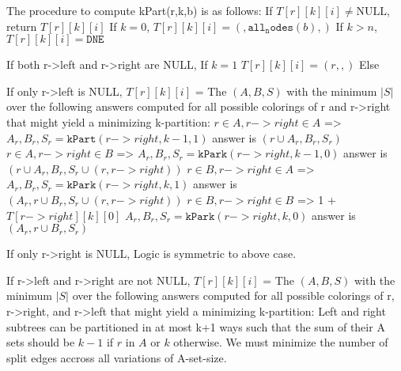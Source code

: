 \documentclass[11pt]{article}
\begin{document}
The procedure to compute kPart(r,k,b) is as follows:
    If $T[r][k][i] \neq \text{NULL}$,
       return $T[r][k][i]$
    If $k = 0$,
       $T[r][k][i] = ({}, {\mathtt{all_nodes}(b)}, {})$
    If $k > n$,
       $T[r][k][i] = \mathtt{DNE}$

    If both r->left and r->right are NULL,
        If $k=1$
            $T[r][k][i] = ({r}, {}, {})$
        Else

    If only r->left is NULL,
        $T[r][k][i]$ = The $(A,B,S)$ with the minimum $|S|$ over the following answers computed for all possible colorings of r and r->right that might yield a minimizing k-partition:
          $r \in A, r->right \in A$ =>
            $A_r, B_r, S_r = \mathtt{kPart}(r->right,k-1,1)$
            answer is $({r} \cup A_r, B_r, S_r)$
          $r \in A, r->right \in B$ =>
            $A_r, B_r, S_r = \mathtt{kPark}(r->right,k-1,0)$
            answer is $({r} \cup A_r, B_r, S_r \cup {(r, r->right)})$
          $r \in B, r->right \in A$ =>
            $A_r, B_r, S_r = \mathtt{kPark}(r->right,k,1)$
            answer is $(A_r,{r} \cup B_r, S_r \cup {(r, r->right)})$
          $r \in B, r->right \in B$ => 1 + $T[r->right][k][0]$
            $A_r, B_r, S_r = \mathtt{kPark}(r->right,k,0)$
            answer is $(A_r,{r} \cup B_r, S_r)$

    If only r->right is NULL,
        Logic is symmetric to above case.



    If r->left and r->right are not NULL,
        $T[r][k][i]$ = The $(A,B,S)$ with the minimum $|S|$ over the following answers computed for all possible colorings of r, r->right, and r->left that might yield a minimizing k-partition:
                Left and right subtrees can be partitioned in at most k+1 ways such that the sum of their A sets should be $k-1$ if $r$ in $A$ or $k$ otherwise.
                We must minimize the number of split edges accross all variations of A-set-size.
\end{document}
